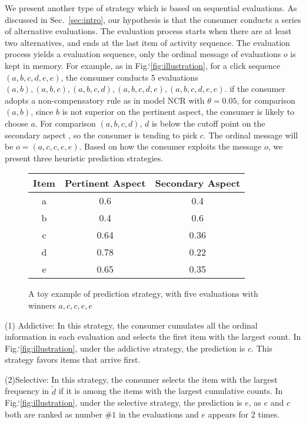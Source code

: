 \documentclass[sigconf]{acmart}
\begin{document}

We present another type of strategy which is based on sequential evaluations. As discussed in Sec.~\ref{sec:intro}, our hypothesis is that the consumer conducts a series of alternative evaluations. The evaluation process starts when there are at least two alternatives, and ends at the last item of activity sequence. The evaluation process yields a evaluation sequence, only the ordinal message of evaluations $o$ is kept in memory. For example, as in Fig.`\ref{fig:illustration}, for a click sequence $(a,b,c,d,e,e)$, the consumer conducts 5 evaluations $(a,b), (a,b,c),(a,b,c,d),(a,b,c,d,e),(a,b,c,d,e,e) $. if the consumer adopts a non-compensatory rule as in model NCR with $\theta=0.05$, for comparison $(a,b)$, since $b$ is not superior on the pertinent aspect, the consumer is likely to choose $a$. For comparison $(a,b,c,d)$,  $d$ is below the cutoff point on the secondary aspect , so the consumer is tending to pick $c$. The ordinal message will be $o=(a,c,c,e,e)$. Based on how the consumer exploits the message $o$, we present three heuristic prediction strategies.


\begin{figure}[htbp]
\begin{center}
\begin{tabular}{|c|c|c|}
\hline
Item & Pertinent Aspect & Secondary Aspect \\\hline
a & 0.6 & 0.4 \\
b & 0.4 & 0.6  \\
c & 0.64 & 0.36 \\
d & 0.78 & 0.22 \\
e & 0.65 & 0.35 \\\hline
\end{tabular}
\caption{A toy example of prediction strategy, with five evaluations with winners $a,c,c,e,e$}
\label{default}
\end{center}
\end{figure}\label{fig:illustration}

(1) Addictive: In this strategy, the consumer cumulates all the ordinal information in each evaluation and selects the first item with the largest count. In Fig.`\ref{fig:illustration},  under the addictive strategy, the prediction is $c$. This strategy favors items that arrive first.

(2)Selective: In this strategy, the consumer selects the item with the largest frequency in $\tilde{d}$ if it is among the items with the largest cumulative counts. In Fig.`\ref{fig:illustration},  under the selective strategy, the prediction is $e$, as $e$ and $c$ both are ranked as number $\#1$ in the evaluations and $e$ appears for 2 times.
\end{document}

